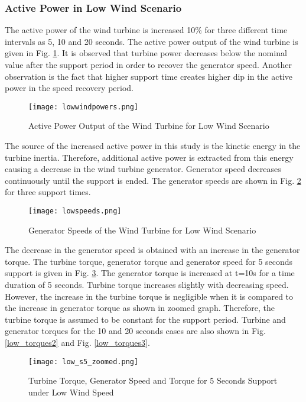 \subsubsection{Active Power in Low Wind Scenario}
The active power of the wind turbine is increased 10\% for three different time intervals as 5, 10 and 20 seconds. The active power output of the wind turbine is given in Fig. \ref{lowactivepowers}. It is observed that turbine power decreases below the nominal value after the support period in order to recover the generator speed. Another observation is the fact that higher support time creates higher dip in the active power in the speed recovery period.\par
\begin{figure}[h!]
	\centering
	\texttt{[image: lowwindpowers.png]}
	\caption{Active Power Output of the Wind Turbine for Low Wind Scenario}
	\label{lowactivepowers}
\end{figure}
The source of the increased active power in this study is the kinetic energy in the turbine inertia. Therefore, additional active power is extracted from this energy causing a decrease in the wind turbine generator. Generator speed decreases continuously until the support is ended. The generator speeds are shown in Fig. \ref{low_speeds} for three support times.\par
\begin{figure}[h!]
	\centering
	\texttt{[image: lowspeeds.png]}
	\caption{Generator Speeds of the Wind Turbine for Low Wind Scenario}
	\label{low_speeds}
\end{figure}
The decrease in the generator speed is obtained with an increase in the generator torque. The turbine torque, generator torque and generator speed for 5 seconds support is given in Fig. \ref{low_torques}. The generator torque is increased at t=10s for a time duration of 5 seconds. Turbine torque increases slightly with decreasing speed. However, the increase in the turbine torque is negligible when it is compared to the increase in generator torque as shown in zoomed graph. Therefore, the turbine torque is assumed to be constant for the support period. Turbine and generator torques for the 10 and 20 seconds cases are also shown in Fig. \ref{low_torques2} and Fig. \ref{low_torques3}. 
\begin{figure}[h!]
	\centering
	\texttt{[image: low\_s5\_zoomed.png]}
	\caption{Turbine Torque, Generator Speed and Torque for 5 Seconds Support under Low Wind Speed}
	\label{low_torques}
\end{figure}

